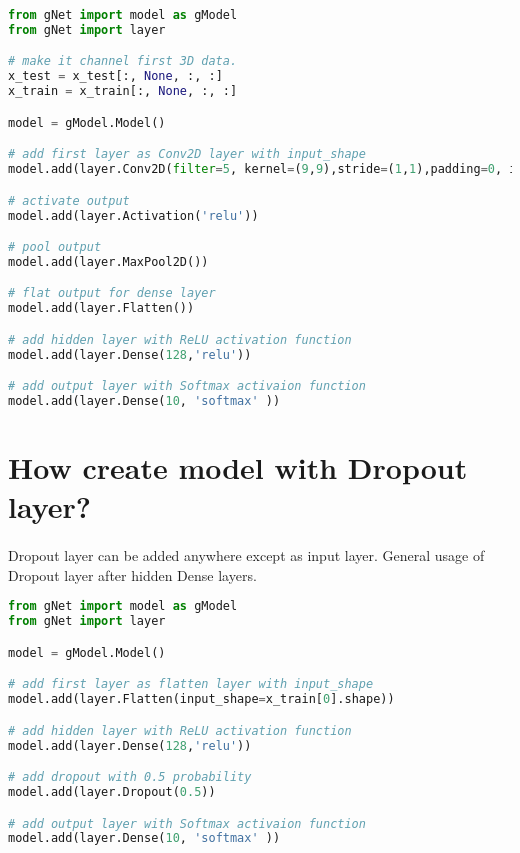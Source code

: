 \documentclass[12pt]{report}
\begin{document}
\begin{lstlisting}[language=Python, numbers=none, caption={Create CNN model.}, label={ex:create-cnn-model}]
from gNet import model as gModel
from gNet import layer

# make it channel first 3D data.
x_test = x_test[:, None, :, :]
x_train = x_train[:, None, :, :]

model = gModel.Model()

# add first layer as Conv2D layer with input_shape
model.add(layer.Conv2D(filter=5, kernel=(9,9),stride=(1,1),padding=0, input_shape=x_train[0].shape, use_bias=True))

# activate output
model.add(layer.Activation('relu'))

# pool output
model.add(layer.MaxPool2D())

# flat output for dense layer
model.add(layer.Flatten())

# add hidden layer with ReLU activation function
model.add(layer.Dense(128,'relu'))

# add output layer with Softmax activaion function 
model.add(layer.Dense(10, 'softmax' ))

\end{lstlisting}



\section{How create model with Dropout layer?}
\paragraph{}
Dropout layer can be added anywhere except as input layer. General usage of Dropout layer after hidden Dense layers. 

\begin{lstlisting}[language=Python, numbers=none, caption={Create model with Dropout.}, label={ex:create-dropout-model}]
from gNet import model as gModel
from gNet import layer

model = gModel.Model()

# add first layer as flatten layer with input_shape
model.add(layer.Flatten(input_shape=x_train[0].shape))

# add hidden layer with ReLU activation function
model.add(layer.Dense(128,'relu'))

# add dropout with 0.5 probability
model.add(layer.Dropout(0.5))

# add output layer with Softmax activaion function 
model.add(layer.Dense(10, 'softmax' ))

\end{lstlisting}
\end{document}
